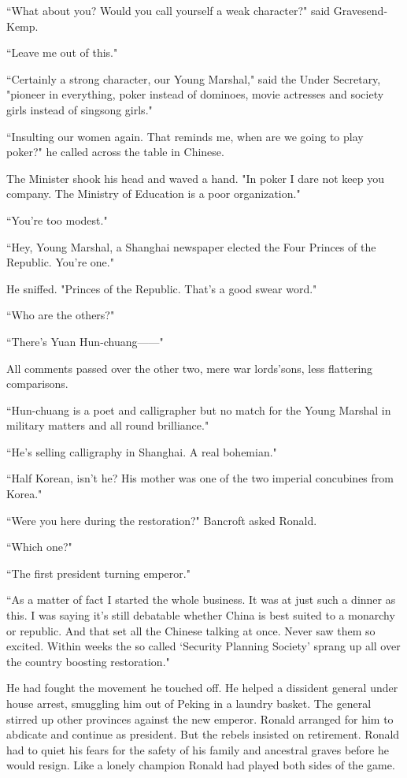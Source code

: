 \par ``What about you? Would you call yourself a weak character?" said Gravesend-Kemp.
\par ``Leave me out of this."
\par ``Certainly a strong character, our Young Marshal," said the Under Secretary, "pioneer in everything, poker instead of dominoes, movie actresses and society girls instead of singsong girls."
\par ``Insulting our women again. That reminds me, when are we going to play poker?" he called across the table in Chinese.
\par The Minister shook his head and waved a hand. "In poker I dare not keep you company. The Ministry of Education is a poor organization."
\par ``You're too modest."
\par ``Hey, Young Marshal, a Shanghai newspaper elected the Four Princes of the Republic. You're one."
\par He sniffed. "Princes of the Republic. That's a good swear word."
\par ``Who are the others?"
\par ``There's Yuan Hun-chuang——"
\par All comments passed over the other two, mere war lords'sons, less flattering comparisons.
\par ``Hun-chuang is a poet and calligrapher but no match for the Young Marshal in military matters and all round brilliance."
\par ``He's selling calligraphy in Shanghai. A real bohemian."
\par ``Half Korean, isn't he? His mother was one of the two imperial concubines from Korea."
\par ``Were you here during the restoration?" Bancroft asked Ronald.
\par ``Which one?"
\par ``The first president turning emperor."
\par ``As a matter of fact I started the whole business. It was at just such a dinner as this. I was saying it's still debatable whether China is best suited to a monarchy or republic. And that set all the Chinese talking at once. Never saw them so excited. Within weeks the so called ‘Security Planning Society' sprang up all over the country boosting restoration."
\par He had fought the movement he touched off. He helped a dissident general under house arrest, smuggling him out of Peking in a laundry basket. The general stirred up other provinces against the new emperor. Ronald arranged for him to abdicate and continue as president. But the rebels insisted on retirement. Ronald had to quiet his fears for the safety of his family and ancestral graves before he would resign. Like a lonely champion Ronald had played both sides of the game.

